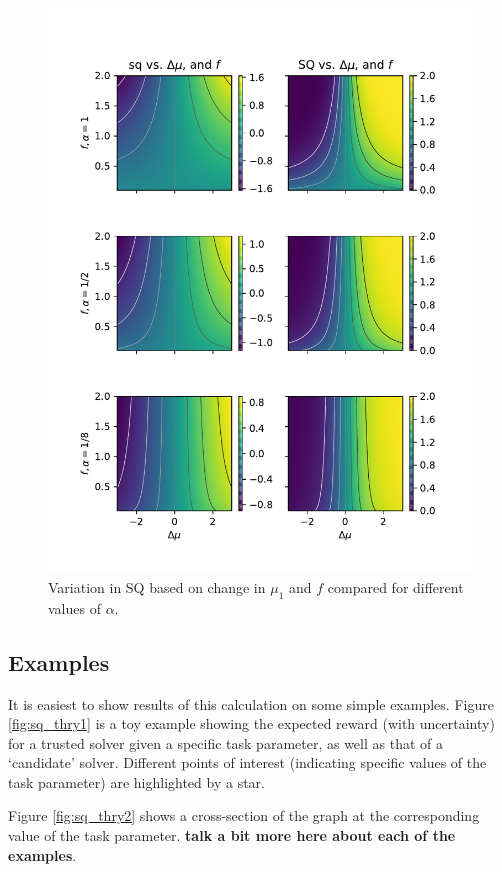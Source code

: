 \begin{figure}[tbp]
    \centering
    \includegraphics[width=0.9\linewidth]{Figures/sq_surf}
    \caption{Variation in SQ based on change in $\mu_1$ and $f$ compared for different values of $\alpha$.}
    \label{fig:sq_surf}
\end{figure}

\subsection{Examples}
It is easiest to show results of this calculation on some simple examples. Figure \ref{fig:sq_thry1} is a toy example showing the expected reward (with uncertainty) for a trusted solver given a specific task parameter, as well as that of a `candidate' solver. Different points of interest (indicating specific values of the task parameter) are highlighted by a star.

Figure \ref{fig:sq_thry2} shows a cross-section of the graph at the corresponding value of the task parameter. \textbf{talk a bit more here about each of the examples}.

